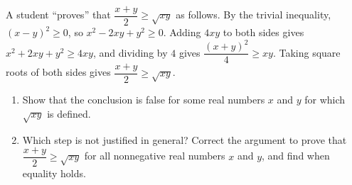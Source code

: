 A student ``proves'' that $\dfrac{x+y}{2}\ge\sqrt{xy}$ as follows. By the trivial inequality, $(x-y)^2\ge0$, so $x^2-2xy+y^2\ge0$. Adding $4xy$ to both sides gives $x^2+2xy+y^2\ge4xy$, and dividing by $4$ gives $\dfrac{(x+y)^2}{4}\ge xy$. Taking square roots of both sides gives $\dfrac{x+y}{2}\ge\sqrt{xy}$.
\begin{enumerate}
\item[(a)] Show that the conclusion is false for some real numbers $x$ and $y$ for which $\sqrt{xy}$ is defined.
\item[(b)] Which step is not justified in general? Correct the argument to prove that $\dfrac{x+y}{2}\ge\sqrt{xy}$ for all nonnegative real numbers $x$ and $y$, and find when equality holds.
\end{enumerate}
